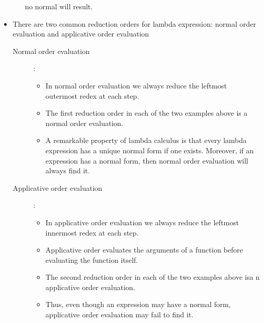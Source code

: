 \documentclass[]{article}
\begin{document}
\begin{itemize}
\begin{enumerate}
no normal will result.
\end{enumerate}
\item There are two common reduction orders for lambda expression: normal order
evaluation and applicative order evaluation
\begin{description}
\item[Normal order evaluation]:
\begin{itemize}
\item In normal order evaluation we always reduce the leftmost outermost redex
at each step.
\item The first reduction order in each of the two examples above is a normal
order evaluation.
\item A remarkable property of lambda calculus is that every lambda expression
has a unique normal form if one exists. Moreover, if an expression has a normal
form, then normal order evaluation will always find it.
\end{itemize}
\item[Applicative order evaluation]:
\begin{itemize}
\item In applicative order evaluation we always reduce the leftmost innermost
redex at each step.
\item Applicative order evaluates the arguments of a function before evaluating
the function itself.
\item The second reduction order in each of the two examples above isa n
applicative order evaluation.
\item Thus, even though an expression may have a normal form, applicative order
evaluation may fail to find it.
\end{itemize}
\end{description}
\end{itemize}
\end{document}
